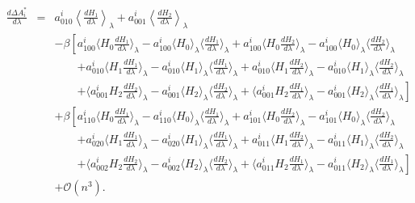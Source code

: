 \documentclass[%
 preprint,
 amsmath,amssymb,
 aps,
]{revtex4-1}
\begin{document}
\begin{eqnarray}
\frac{d \Delta A^*_i}{d \lambda} &=&
a^i_{010}  \left\langle \frac{dH_1}{d \lambda} \right \rangle_{\lambda} + 
a^i_{001}  \left\langle \frac{dH_2}{d \lambda} \right \rangle_{\lambda} 
\label{e:Aderv} \\ & & 
 -\beta \left[ a^i_{100} \langle  H_0 \frac{dH_1}{d \lambda}  \rangle_{\lambda} -a^i_{100} \langle  H_0 \rangle_{\lambda}  \langle \frac{dH_1}{d \lambda} \rangle_{\lambda} 
    + a^i_{100} \langle  H_0 \frac{dH_2}{d \lambda}  \rangle_{\lambda} -a^i_{100} \langle  H_0 \rangle_{\lambda}  \langle \frac{dH_2}{d \lambda} \rangle_{\lambda} 
    \right.  \nonumber  \\ & & \qquad \left. 
 +a^i_{010} \langle  H_1 \frac{dH_1}{d \lambda}  \rangle_{\lambda} -a^i_{010} \langle  H_1 \rangle_{\lambda}  \langle \frac{dH_1}{d \lambda} \rangle_{\lambda} 
  +a^i_{010} \langle  H_1 \frac{dH_2}{d \lambda}  \rangle_{\lambda} -a^i_{010} \langle  H_1 \rangle_{\lambda}  \langle \frac{dH_2}{d \lambda} \rangle_{\lambda} 
      \right.  \nonumber  \\ & & \qquad \left. 
   + \langle a^i_{001}  H_2 \frac{dH_2}{d \lambda}  \rangle_{\lambda} -a^i_{001} \langle  H_2 \rangle_{\lambda}  \langle \frac{dH_2}{d \lambda} \rangle_{\lambda} 
      + \langle a^i_{001}  H_2 \frac{dH_1}{d \lambda}  \rangle_{\lambda} -a^i_{001} \langle  H_2 \rangle_{\lambda}  \langle \frac{dH_1}{d \lambda} \rangle_{\lambda} 
  \right] \nonumber \\ & & 
   +\beta \left[ a^i_{110} \langle  H_0 \frac{dH_1}{d \lambda}  \rangle_{\lambda} -a^i_{110} \langle  H_0 \rangle_{\lambda}  \langle \frac{dH_1}{d \lambda} \rangle_{\lambda} 
    + a^i_{101} \langle  H_0 \frac{dH_2}{d \lambda}  \rangle_{\lambda} -a^i_{101} \langle  H_0 \rangle_{\lambda}  \langle \frac{dH_2}{d \lambda} \rangle_{\lambda} 
    \right.  \nonumber  \\ & & \qquad \left. %
 +a^i_{020} \langle  H_1 \frac{dH_1}{d \lambda}  \rangle_{\lambda} -a^i_{020} \langle  H_1 \rangle_{\lambda}  \langle \frac{dH_1}{d \lambda} \rangle_{\lambda} 
  +a^i_{011} \langle  H_1 \frac{dH_2}{d \lambda}  \rangle_{\lambda} -a^i_{011} \langle  H_1 \rangle_{\lambda}  \langle \frac{dH_2}{d \lambda} \rangle_{\lambda} 
      \right.  \nonumber  \\ & & \qquad \left. %
   + \langle a^i_{002}  H_2 \frac{dH_2}{d \lambda}  \rangle_{\lambda} -a^i_{002} \langle  H_2 \rangle_{\lambda}  \langle \frac{dH_2}{d \lambda} \rangle_{\lambda} 
      + \langle a^i_{011}  H_2 \frac{dH_1}{d \lambda}  \rangle_{\lambda} -a^i_{011} \langle  H_2 \rangle_{\lambda}  \langle \frac{dH_1}{d \lambda} \rangle_{\lambda} 
     \right] \nonumber \\ & & 
      + \mathcal{O} (n^3). \nonumber
\end{eqnarray}
\end{document}
